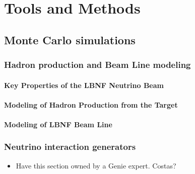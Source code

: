 \chapter{Tools and Methods}
\label{ch:tools}


\section{Monte Carlo simulations}
\label{sec:tools-mc}


\subsection{Hadron production and Beam Line modeling}
\label{sec:tools-mc-had-beam}

\subsubsection{Key Properties of the LBNF Neutrino Beam}
\label{ss:tools-beam-properties}

\subsubsection{Modeling of Hadron Production from the Target}
\label{ss:tools-hadron-production-modeling}

\subsubsection{Modeling of LBNF Beam Line}
\label{ss:tools-beam-line-modeling}

\subsection{Neutrino interaction generators} 
\label{sec:tools-mc-gen}

\begin{itemize}
\item Have this section owned by a Genie expert. Costas?
\end{itemize}


